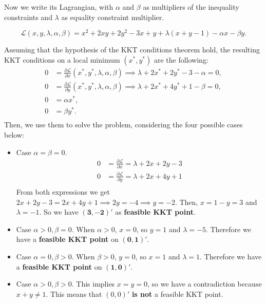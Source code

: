 \documentclass[12pt]{scrartcl}
\begin{document}
Now we write its Lagrangian, with $\alpha$ and $\beta$ as multipliers of the inequality constraints and $\lambda$ as equality constraint multiplier. 


\begin{equation*}
    \mathcal{L}(x, y, \lambda, \alpha, \beta) = x^2 + 2xy + 2y^2 -3x + y + \lambda(x + y -1) - \alpha x - \beta y.
\end{equation*}

\vspace{0.5em}

Assuming that the hypothesis of the KKT conditions theorem hold, the resulting KKT conditions on a local minimum $(x^\ast, y^\ast)$ are the following:
\begin{align*}
    0 &= \frac{\partial \mathcal{L}}{\partial x} (x^\ast, y^\ast, \lambda, \alpha, \beta) \implies \lambda + 2x^\ast + 2y^\ast -3 - \alpha = 0,\\
    0 &= \frac{\partial \mathcal{L}}{\partial y} (x^\ast, y^\ast, \lambda, \alpha, \beta) \implies \lambda + 2x^\ast + 4y^\ast + 1 - \beta = 0,\\
    0 &= \alpha x^\ast ,\\
    0 &= \beta y^\ast .\\
\end{align*}
Then, we use them to solve the problem, considering the four possible cases below:
\begin{itemize}
    \item Case $\alpha = \beta = 0$.
    \begin{align*}
        0 &= \frac{\partial \mathcal{L}}{\partial x} = \lambda + 2x + 2y -3 \\
        0 &= \frac{\partial \mathcal{L}}{\partial y} = \lambda + 2x + 4y + 1 \\
    \end{align*}
    From both expressions we get $2x + 2y -3 = 2x + 4y +1 \implies 2y = -4 \implies y = -2$. Then, $x = 1-y = 3$ and $\lambda=-1$. So we have $\mathbf{(3, -2)'}$ as \textbf{feasible KKT point}.
    \item Case $\alpha > 0, \beta = 0$.
    When $\alpha > 0$, $x=0$, so $y=1$ and $\lambda=-5$. Therefore we have a \textbf{feasible KKT point} on $\mathbf{(0, 1)'}$.
    \item Case $\alpha = 0, \beta > 0$.
    When $\beta > 0$, $y=0$, so $x=1$ and $\lambda=1$. Therefore we have a \textbf{feasible KKT point} on $\mathbf{(1, 0)'}$.
    \item Case $\alpha > 0, \beta > 0$.
    This implies $x=y=0$, so we have a contradiction because $x + y \neq 1$. This means that $(0,0)'$ \textbf{is not} a feasible KKT point.
\end{itemize}
\end{document}
